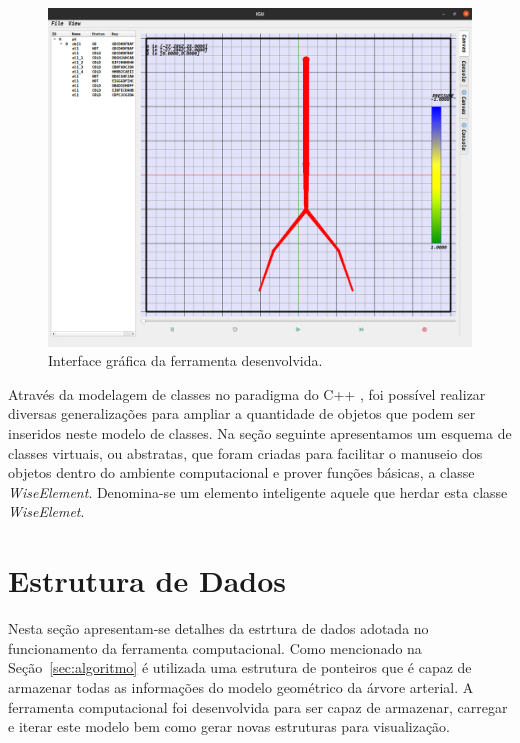 \documentclass[
        english,			
        brazil			        %
        ,<...>]{abntbibufjf}
\begin{document}
\begin{figure}[!htbp]
	\centering
	\includegraphics[scale=0.25]{Figures/IGU.png}
	\caption{Interface gráfica da ferramenta desenvolvida.}
	\label{fig1:gui}
\end{figure}

Através da modelagem de classes no paradigma do C++ \cite{AlanParker}, foi possível realizar diversas generalizações para ampliar a quantidade de objetos que podem ser inseridos neste modelo de classes. Na seção seguinte apresentamos um esquema de classes virtuais, ou abstratas, que foram criadas para facilitar o manuseio dos objetos dentro do ambiente computacional e prover funções básicas, a classe \textit{WiseElement}. Denomina-se um elemento inteligente aquele que herdar esta classe \textit{WiseElemet}.

\section{Estrutura de Dados}\label{sec:estrutura}

Nesta seção apresentam-se detalhes da estrtura de dados adotada no funcionamento da ferramenta computacional. Como mencionado na Seção~\ref{sec:algoritmo} é utilizada uma estrutura de ponteiros que é capaz de armazenar todas as informações do modelo geométrico da árvore arterial. A ferramenta computacional foi desenvolvida para ser capaz de armazenar, carregar e iterar este modelo bem como gerar novas estruturas para visualização.
\end{document}
